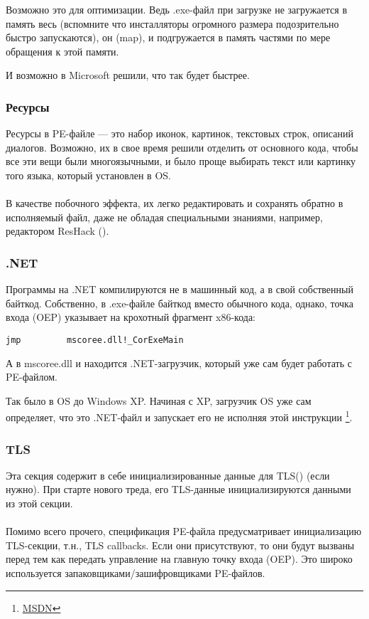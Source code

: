 Возможно это для оптимизации.
Ведь .exe-файл при загрузке не загружается в память весь 
(вспомните что инсталляторы огромного размера подозрительно быстро запускаются), он  (map), 
и подгружается в память частями по мере обращения к этой памяти.

И возможно в Microsoft решили, что так будет быстрее.

\subsubsection{Ресурсы}

\label{PEresources}
Ресурсы в PE-файле --- это набор иконок, картинок, текстовых строк, описаний диалогов.
Возможно, их в свое время решили отделить от основного кода, чтобы все эти вещи были многоязычными,
и было проще выбирать текст или картинку того языка, который установлен в \ac{OS}. \\
\\
В качестве побочного эффекта, их легко редактировать и сохранять обратно в исполняемый файл,
даже не обладая специальными знаниями, например, редактором ResHack ().

\subsubsection{.NET}

Программы на .NET компилируются не в машинный код, а в свой собственный байткод.
Собственно, в .exe-файле байткод вместо обычного кода, однако, точка входа (\ac{OEP}) 
указывает на крохотный фрагмент x86-кода:

\begin{lstlisting}[style=customasmx86]
jmp         mscoree.dll!_CorExeMain
\end{lstlisting}

А в mscoree.dll и находится .NET-загрузчик, который уже сам будет работать с PE-файлом.

Так было в \ac{OS} до Windows XP. Начиная с XP, загрузчик \ac{OS} уже сам определяет, что это
.NET-файл и запускает его не исполняя этой инструкции \JMP
\footnote{\href{http://go.yurichev.com/17051}{MSDN}}.

\subsubsection{TLS}

Эта секция содержит в себе инициализированные данные для \ac{TLS}() (если нужно).
При старте нового треда, его \ac{TLS}-данные инициализируются данными из этой секции. \\
\\
Помимо всего прочего, спецификация PE-файла предусматривает инициализацию \ac{TLS}-секции, т.н., TLS callbacks.
Если они присутствуют, то они будут вызваны перед тем как передать управление на главную точку входа (\ac{OEP}).
Это широко используется запаковщиками/зашифровщиками PE-файлов.

